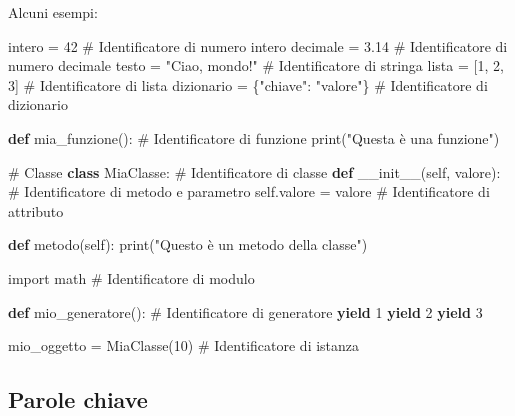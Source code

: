 \documentclass[
  letterpaper,
]{scrbook}
\newenvironment{Shaded}{\begin{snugshade}}{\end{snugshade}}
\newcommand{\BuiltInTok}[1]{\textcolor[rgb]{0.00,0.23,0.31}{#1}}
\newcommand{\CommentTok}[1]{\textcolor[rgb]{0.37,0.37,0.37}{#1}}
\newcommand{\ControlFlowTok}[1]{\textcolor[rgb]{0.00,0.23,0.31}{\textbf{#1}}}
\newcommand{\DecValTok}[1]{\textcolor[rgb]{0.68,0.00,0.00}{#1}}
\newcommand{\FloatTok}[1]{\textcolor[rgb]{0.68,0.00,0.00}{#1}}
\newcommand{\FunctionTok}[1]{\textcolor[rgb]{0.28,0.35,0.67}{#1}}
\newcommand{\ImportTok}[1]{\textcolor[rgb]{0.00,0.46,0.62}{#1}}
\newcommand{\KeywordTok}[1]{\textcolor[rgb]{0.00,0.23,0.31}{\textbf{#1}}}
\newcommand{\NormalTok}[1]{\textcolor[rgb]{0.00,0.23,0.31}{#1}}
\newcommand{\OperatorTok}[1]{\textcolor[rgb]{0.37,0.37,0.37}{#1}}
\newcommand{\StringTok}[1]{\textcolor[rgb]{0.13,0.47,0.30}{#1}}
\newcommand{\VariableTok}[1]{\textcolor[rgb]{0.07,0.07,0.07}{#1}}
\begin{document}
Alcuni esempi:

\begin{Shaded}
\begin{Highlighting}[]
\NormalTok{intero }\OperatorTok{=} \DecValTok{42}  \CommentTok{\# Identificatore di numero intero}
\NormalTok{decimale }\OperatorTok{=} \FloatTok{3.14}  \CommentTok{\# Identificatore di numero decimale}
\NormalTok{testo }\OperatorTok{=} \StringTok{"Ciao, mondo!"}  \CommentTok{\# Identificatore di stringa}
\NormalTok{lista }\OperatorTok{=}\NormalTok{ [}\DecValTok{1}\NormalTok{, }\DecValTok{2}\NormalTok{, }\DecValTok{3}\NormalTok{]  }\CommentTok{\# Identificatore di lista}
\NormalTok{dizionario }\OperatorTok{=}\NormalTok{ \{}\StringTok{"chiave"}\NormalTok{: }\StringTok{"valore"}\NormalTok{\}  }\CommentTok{\# Identificatore di dizionario}

\KeywordTok{def}\NormalTok{ mia\_funzione(): }\CommentTok{\# Identificatore di funzione}
  \BuiltInTok{print}\NormalTok{(}\StringTok{"Questa è una funzione"}\NormalTok{)}

\CommentTok{\# Classe}
\KeywordTok{class}\NormalTok{ MiaClasse: }\CommentTok{\# Identificatore di classe}
  \KeywordTok{def} \FunctionTok{\_\_init\_\_}\NormalTok{(}\VariableTok{self}\NormalTok{, valore): }\CommentTok{\# Identificatore di metodo e parametro}
    \VariableTok{self}\NormalTok{.valore }\OperatorTok{=}\NormalTok{ valore  }\CommentTok{\# Identificatore di attributo}
    
  \KeywordTok{def}\NormalTok{ metodo(}\VariableTok{self}\NormalTok{):}
    \BuiltInTok{print}\NormalTok{(}\StringTok{"Questo è un metodo della classe"}\NormalTok{)}

\ImportTok{import}\NormalTok{ math  }\CommentTok{\# Identificatore di modulo}

\KeywordTok{def}\NormalTok{ mio\_generatore(): }\CommentTok{\# Identificatore di generatore}
  \ControlFlowTok{yield} \DecValTok{1}
  \ControlFlowTok{yield} \DecValTok{2}
  \ControlFlowTok{yield} \DecValTok{3}

\NormalTok{mio\_oggetto }\OperatorTok{=}\NormalTok{ MiaClasse(}\DecValTok{10}\NormalTok{)  }\CommentTok{\# Identificatore di istanza}
\end{Highlighting}
\end{Shaded}

\subsection{Parole chiave}\label{parole-chiave}
\end{document}
